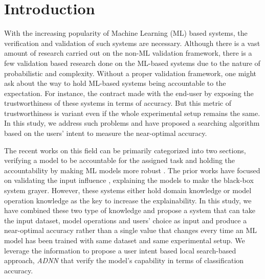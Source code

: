 
\section{Introduction}
With the increasing popularity of Machine Learning (ML) based systems, the verification and validation of such systems are necessary. Although there is a vast amount of research carried out on the non-ML validation framework, there is a few validation based research done on the ML-based systems due to the nature of probabilistic and complexity. Without a proper validation framework, one might ask about the way to hold ML-based systems being accountable to the expectation. For instance, the contract made with the end-user by exposing the trustworthiness of these systems in terms of accuracy. But this metric of trustworthiness is variant even if the whole experimental setup remains the same. In this study, we address such problems and have proposed a searching algorithm based on the users' intent to measure the near-optimal accuracy.

The recent works on this field can be primarily categorized into two sections, verifying a model to be accountable for the assigned task \cite{pulina2010abstraction,gehr2018ai2,du2018techniques,abdul2018trends,zhang2016understanding}  and holding the accountability by making ML models more robust \cite{wang2018formal,katz2017reluplex,jia2019taso}. The prior works have focused on validating the input influence \cite{datta2016algorithmic}, explaining the models to make the black-box system grayer. However, these systems either hold domain knowledge or model operation knowledge as the key to increase the explainability. In this study, we have combined these two type of knowledge and propose a system that can take the input dataset, model operations and users' choice as input and produce a near-optimal accuracy rather than a single value that changes every time an ML model has been trained with same dataset and same experimental setup. 
We leverage the information to propose a user intent based local search-based approach, \emph{ADNN} that verify the model's capability in terms of classification accuracy.
